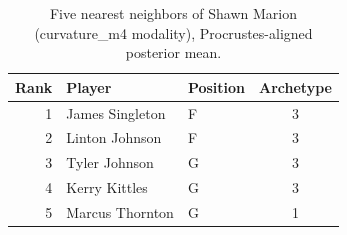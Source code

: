 \begin{table}[htbp]
  \centering\small
  \begin{tabular}{rllc}
    \toprule
    Rank & Player & Position & Archetype \\
    \midrule
    1 & James Singleton & F & 3 \\
    2 & Linton Johnson & F & 3 \\
    3 & Tyler Johnson & G & 3 \\
    4 & Kerry Kittles & G & 3 \\
    5 & Marcus Thornton & G & 1 \\
    \bottomrule
  \end{tabular}
  \caption{Five nearest neighbors of Shawn Marion (curvature_m4 modality), Procrustes-aligned posterior mean.}
  \label{tab:Shawn_Marion_neighbors_curvature_m4}
\end{table}


